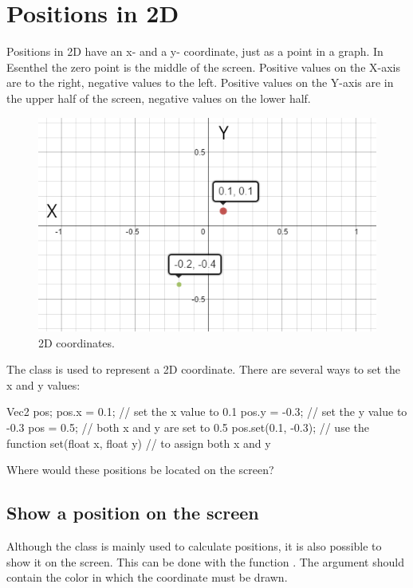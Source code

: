 \chapter{Positions in 2D}
\label{chapter:positions}

Positions in 2D have an x- and a y- coordinate, just as a point in a graph. In Esenthel the zero point is the middle of the screen. Positive values on the X-axis are to the right, negative values to the left. Positive values on the Y-axis are in the upper half of the screen, negative values on the lower half.

\begin{figure}[h]
\centering
\includegraphics[width=0.7\linewidth]{images/2Dpositions.png}
\caption[]{2D coordinates.}
\label{fig:pos2D}
\end{figure}

The class  is used to represent a 2D coordinate. There are several ways to set the x and y values:

\begin{code}
Vec2 pos;
pos.x =  0.1;       // set the x value to  0.1
pos.y = -0.3;       // set the y value to -0.3
pos   =  0.5;       // both x and y are set to 0.5
pos.set(0.1, -0.3); // use the function set(float x, float y) 
                    // to assign both x and y
\end{code}

\begin{exercise}
Where would these positions be located on the screen?
\end{exercise}

\section{Show a position on the screen}

Although the class  is mainly used to calculate positions, it is also possible to show it on the screen. This can be done with the function . The argument should contain the color in which the coordinate must be drawn.

